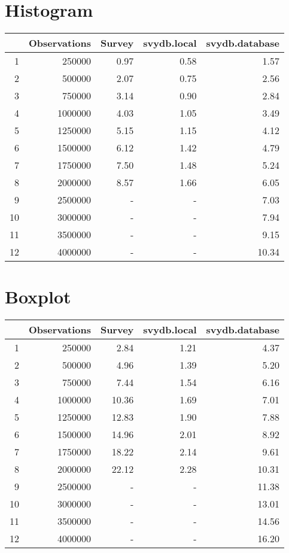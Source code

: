 \section{Histogram}
\begin{table}[ht]
\centering
\begin{tabular}{rrrrr}
  \hline
 & Observations & Survey & svydb.local & svydb.database \\ 
  \hline
1 & 250000 & 0.97 & 0.58 & 1.57 \\ 
  2 & 500000 & 2.07 & 0.75 & 2.56 \\ 
  3 & 750000 & 3.14 & 0.90 & 2.84 \\ 
  4 & 1000000 & 4.03 & 1.05 & 3.49 \\ 
  5 & 1250000 & 5.15 & 1.15 & 4.12 \\ 
  6 & 1500000 & 6.12 & 1.42 & 4.79 \\ 
  7 & 1750000 & 7.50 & 1.48 & 5.24 \\ 
  8 & 2000000 & 8.57 & 1.66 & 6.05 \\ 
  9 & 2500000 & - & - & 7.03 \\ 
  10 & 3000000 & - & - & 7.94 \\ 
  11 & 3500000 & - & - & 9.15 \\ 
  12 & 4000000 & - & - & 10.34 \\ 
  \hline
\end{tabular}
\end{table}

\section{Boxplot}
\begin{table}[ht]
\centering
\begin{tabular}{rrrrr}
  \hline
 & Observations & Survey & svydb.local & svydb.database \\ 
  \hline
1 & 250000 & 2.84 & 1.21 & 4.37 \\ 
  2 & 500000 & 4.96 & 1.39 & 5.20 \\ 
  3 & 750000 & 7.44 & 1.54 & 6.16 \\ 
  4 & 1000000 & 10.36 & 1.69 & 7.01 \\ 
  5 & 1250000 & 12.83 & 1.90 & 7.88 \\ 
  6 & 1500000 & 14.96 & 2.01 & 8.92 \\ 
  7 & 1750000 & 18.22 & 2.14 & 9.61 \\ 
  8 & 2000000 & 22.12 & 2.28 & 10.31 \\ 
  9 & 2500000 & - & - & 11.38 \\ 
  10 & 3000000 & - & - & 13.01 \\ 
  11 & 3500000 & - & - & 14.56 \\ 
  12 & 4000000 & - & - & 16.20 \\ 
  \hline
\end{tabular}
\end{table}

